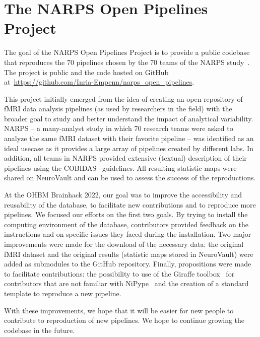 \documentclass[../main.tex]{subfiles}
\begin{document}
\section{The NARPS Open Pipelines Project}




The goal of the NARPS Open Pipelines Project is to provide a public codebase that reproduces the 70 pipelines chosen by the 70 teams of the NARPS study~\parencite{botviniknezer2020}. The project is public and the code hosted on GitHub at~\url{https://github.com/Inria-Empenn/narps_open_pipelines}.

This project initially emerged from the idea of creating an open repository of fMRI data analysis pipelines (as used by researchers in the field) with the broader goal to study and better understand the impact of analytical variability. NARPS -- a many-analyst study in which 70 research teams were asked to analyze the same fMRI dataset with their favorite pipeline -- was identified as an ideal usecase as it provides a large array of pipelines created by different labs. In addition, all teams in NARPS provided extensive (textual) description of their pipelines using the COBIDAS~\parencite{nichols2017} guidelines. All resulting statistic maps were shared on NeuroVault \parencite{gorgolewski2015} and can be used to assess the success of the reproductions. 

At the OHBM Brainhack 2022, our goal was to improve the accessibility and reusability of the database, to facilitate new contributions and to reproduce more pipelines. We focused our efforts on the first two goals. By trying to install the computing environment of the database, contributors provided feedback on the instructions and on specific issues they faced during the installation. Two major improvements were made for the download of the necessary data: the original fMRI dataset and the original results (statistic maps stored in NeuroVault) were added as submodules to the GitHub repository. Finally, propositions were made to facilitate contributions: the possibility to use of the Giraffe toolbox~\parencite{giraffe_vanMourik2016} for contributors that are not familiar with NiPype~\parencite{gorgolewski2017} and the creation of a standard template to reproduce a new pipeline. 

With these improvements, we hope that it will be easier for new people to contribute to reproduction of new pipelines. We hope to continue growing the codebase in the future. 

\printbibliography
\end{document}
